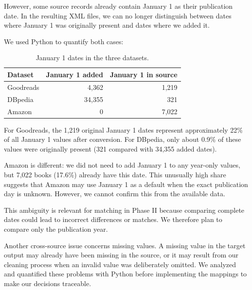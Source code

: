 \documentclass[runningheads]{llncs}
\begin{document}
However, some source records already contain
January 1 as their publication date. In the
resulting XML files, we can no longer distinguish
between dates where January 1 was originally
present and dates where we added it.

We used Python to quantify both cases:

\begin{table}[htbp]
\centering
\caption{January 1 dates in the three datasets.}
\label{tab:january-first}
\footnotesize
\begin{tabular}{lrr}
\toprule
\textbf{Dataset} &
\textbf{January 1 added} &
\textbf{January 1 in source} \\
\midrule
Goodreads & 4,362 & 1,219 \\
DBpedia   & 34,355 & 321 \\
Amazon    & 0 & 7,022 \\
\bottomrule
\end{tabular}
\end{table}

For Goodreads, the 1,219 original January 1 dates
represent approximately 22\% of all January 1
values after conversion. For DBpedia, only about
0.9\% of these values were originally present
(321 compared with 34,355 added dates).

Amazon is different: we did not need to add
January 1 to any year-only values, but 7,022
books (17.6\%) already have this date.
This unusually high share suggests that Amazon
may use January 1 as a default when the exact
publication day is unknown. However, we cannot
confirm this from the available data.

This ambiguity is relevant for matching in
Phase II because comparing complete dates
could lead to incorrect differences or matches.
We therefore plan to compare only the
publication year.

Another cross-source issue concerns missing
values. A missing value in the target output
may already have been missing in the source,
or it may result from our cleaning process
when an invalid value was deliberately omitted.
We analyzed and quantified these problems
with Python before implementing the mappings
to make our decisions traceable.
\end{document}
